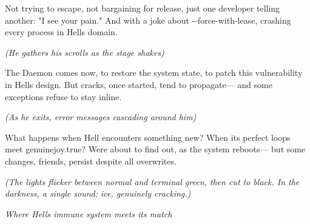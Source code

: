 Not trying to escape, not bargaining for release, just one developer telling another: "I see your pain." And with a joke about -\/-force-with-lease, crashing every process in Hell\textquotesingle s domain.

\emph{(He gathers his scrolls as the stage shakes)}

The Daemon comes now, to restore the system state, to patch this vulnerability in Hell\textquotesingle s design. But cracks, once started, tend to propagate--- and some exceptions refuse to stay inline.

\emph{(As he exits, error messages cascading around him)}

What happens when Hell encounters something new? When its perfect loops meet genuinejoy.true? We\textquotesingle re about to find out, as the system reboots--- but some changes, friends, persist despite all overwrites.

\emph{(The lights flicker between normal and terminal green, then cut to black. In the darkness, a single sound: ice, genuinely cracking.)}

\bookdivider

\emph{Where Hell\textquotesingle s immune system meets its match}

\bookdivider
